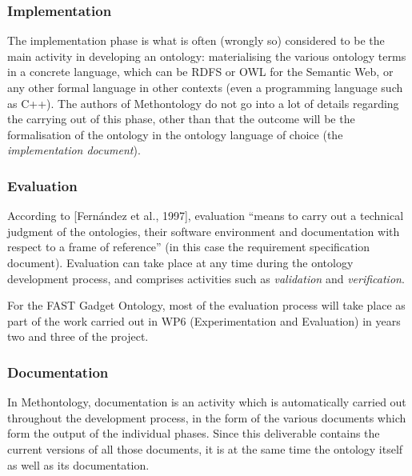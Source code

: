 \documentclass{fast_latex}
\begin{document}
\subsubsection{Implementation} %
\label{ssub:implementation}

The implementation phase is what is often (wrongly so) considered to be the main activity in developing an ontology: materialising the various ontology terms in a concrete language, which can be RDFS or OWL for the Semantic Web, or any other formal language in other contexts (even a programming language such as C++). The authors of Methontology do not go into a lot of details regarding the carrying out of this phase, other than that the outcome will be the formalisation of the ontology in the ontology language of choice (the \emph{implementation document}).

\subsubsection{Evaluation} %
\label{ssub:evaluation}

According to [Fernández et  al., 1997], evaluation ``means to carry out a technical judgment of the ontologies, their software environment and documentation with respect to a frame of reference'' (in this case the requirement specification document). Evaluation can take place at any time during the ontology development process, and comprises activities such as \emph{validation} and \emph{verification}.

For the FAST Gadget Ontology, most of the evaluation process will take place as part of the work carried out in WP6 (Experimentation and Evaluation) in years two and three of the project.

\subsubsection{Documentation} %
\label{ssub:documentation}

In Methontology, documentation is an activity which is automatically carried out throughout the development process, in the form of the various documents which form the output of the individual phases. Since this deliverable contains the current versions of all those documents, it is at the same time the ontology itself as well as its documentation.

\end{document}
